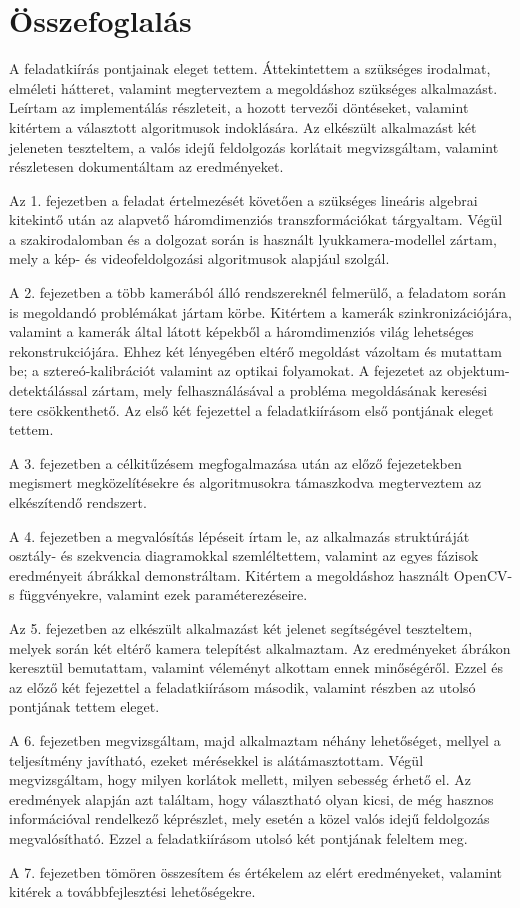 \chapter{Összefoglalás}

A feladatkiírás pontjainak eleget tettem. Áttekintettem a szükséges irodalmat, elméleti hátteret, valamint megterveztem a megoldáshoz szükséges alkalmazást. Leírtam az implementálás részleteit, a hozott tervezői döntéseket, valamint kitértem a választott algoritmusok indoklására. Az elkészült alkalmazást két jeleneten teszteltem, a valós idejű feldolgozás korlátait megvizsgáltam, valamint részletesen dokumentáltam az eredményeket.

Az 1. fejezetben a feladat értelmezését követően a szükséges lineáris algebrai kitekintő után az alapvető háromdimenziós transzformációkat tárgyaltam. Végül a szakirodalomban és a dolgozat során is használt lyukkamera-modellel zártam, mely a kép- és videofeldolgozási algoritmusok alapjául szolgál.

A 2. fejezetben a több kamerából álló rendszereknél felmerülő, a feladatom során is megoldandó problémákat jártam körbe. Kitértem a kamerák szinkronizációjára, valamint a kamerák által látott képekből a háromdimenziós világ lehetséges rekonstrukciójára. Ehhez két lényegében eltérő megoldást vázoltam és mutattam be; a sztereó-kalibrációt valamint az optikai folyamokat. A fejezetet az objektum-detektálással zártam, mely felhasználásával a probléma megoldásának keresési tere csökkenthető. Az első két fejezettel a feladatkiírásom első pontjának eleget tettem.

A 3. fejezetben a célkitűzésem megfogalmazása után az előző fejezetekben megismert megközelítésekre és algoritmusokra támaszkodva megterveztem az elkészítendő rendszert.

A 4. fejezetben a megvalósítás lépéseit írtam le, az alkalmazás struktúráját osztály- és szekvencia diagramokkal szemléltettem, valamint az egyes fázisok eredményeit ábrákkal demonstráltam. Kitértem a megoldáshoz használt OpenCV-s függvényekre, valamint ezek paraméterezéseire.

Az 5. fejezetben az elkészült alkalmazást két jelenet segítségével teszteltem, melyek során két eltérő kamera telepítést alkalmaztam. Az eredményeket ábrákon keresztül bemutattam, valamint véleményt alkottam ennek minőségéről. Ezzel és az előző két fejezettel a feladatkiírásom második, valamint részben az utolsó pontjának tettem eleget.

A 6. fejezetben megvizsgáltam, majd alkalmaztam néhány lehetőséget, mellyel a teljesítmény javítható, ezeket mérésekkel is alátámasztottam. Végül megvizsgáltam, hogy milyen korlátok mellett, milyen sebesség érhető el. Az eredmények alapján azt találtam, hogy választható olyan kicsi, de még hasznos információval rendelkező képrészlet, mely esetén a közel valós idejű feldolgozás megvalósítható. Ezzel a feladatkiírásom utolsó két pontjának feleltem meg.

A 7. fejezetben tömören összesítem és értékelem az elért eredményeket, valamint kitérek a továbbfejlesztési lehetőségekre.
